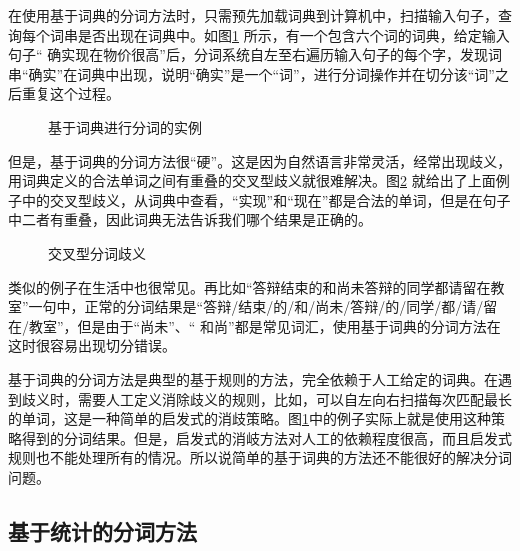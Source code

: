 \parinterval 在使用基于词典的分词方法时，只需预先加载词典到计算机中，扫描输入句子，查询每个词串是否出现在词典中。如图\ref{fig:2-8} 所示，有一个包含六个词的词典，给定输入句子`` 确实现在物价很高''后，分词系统自左至右遍历输入句子的每个字，发现词串``确实''在词典中出现，说明``确实''是一个``词''，进行分词操作并在切分该``词''之后重复这个过程。

\begin{figure}[htp]
\centering

\caption{基于词典进行分词的实例}
\label{fig:2-8}
\end{figure}

\parinterval 但是，基于词典的分词方法很``硬''。这是因为自然语言非常灵活，经常出现歧义，用词典定义的合法单词之间有重叠的交叉型歧义就很难解决。图\ref{fig:2-9} 就给出了上面例子中的交叉型歧义，从词典中查看，``实现''和``现在''都是合法的单词，但是在句子中二者有重叠，因此词典无法告诉我们哪个结果是正确的。

\begin{figure}[htp]
\centering

\caption{交叉型分词歧义}
\label{fig:2-9}
\end{figure}

\parinterval 类似的例子在生活中也很常见。再比如``答辩结束的和尚未答辩的同学都请留在教室''一句中，正常的分词结果是``答辩/结束/的/和/尚未/答辩/的/同学/都/请/留在/教室''，但是由于``尚未''、`` 和尚''都是常见词汇，使用基于词典的分词方法在这时很容易出现切分错误。

\parinterval 基于词典的分词方法是典型的基于规则的方法，完全依赖于人工给定的词典。在遇到歧义时，需要人工定义消除歧义的规则，比如，可以自左向右扫描每次匹配最长的单词，这是一种简单的启发式的消歧策略。图\ref{fig:2-8}中的例子实际上就是使用这种策略得到的分词结果。但是，启发式的消岐方法对人工的依赖程度很高，而且启发式规则也不能处理所有的情况。所以说简单的基于词典的方法还不能很好的解决分词问题。


\subsection{基于统计的分词方法}\label{sec2:statistical-seg}


